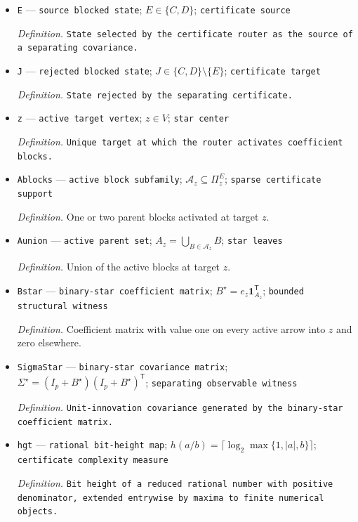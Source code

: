\documentclass{article}
\begin{document}
\begin{itemize}
  \item \texttt{E} --- \texttt{source blocked state}; \(E\in\{C,D\}\); \texttt{certificate source}
  \par\smallskip\noindent\emph{Definition.} \texttt{State selected by the certificate router as the source of a separating covariance.}
  \item \texttt{J} --- \texttt{rejected blocked state}; \(J\in\{C,D\}\setminus\{E\}\); \texttt{certificate target}
  \par\smallskip\noindent\emph{Definition.} \texttt{State rejected by the separating certificate.}
  \item \texttt{z} --- \texttt{active target vertex}; \(z\in V\); \texttt{star center}
  \par\smallskip\noindent\emph{Definition.} \texttt{Unique target at which the router activates coefficient blocks.}
  \item \texttt{Ablocks} --- \texttt{active block subfamily}; \(\mathcal A_z\subseteq\Pi^E_z\); \texttt{sparse certificate support}
  \par\smallskip\noindent\emph{Definition.} One or two parent blocks activated at target \(z\).
  \item \texttt{Aunion} --- \texttt{active parent set}; \(A_z=\bigcup_{B\in\mathcal A_z}B\); \texttt{star leaves}
  \par\smallskip\noindent\emph{Definition.} Union of the active blocks at target \(z\).
  \item \texttt{Bstar} --- \texttt{binary-\allowbreak{}star coefficient matrix}; \(B^{\star}=e_z\mathbf 1_{A_z}^{\mathsf T}\); \texttt{bounded structural witness}
  \par\smallskip\noindent\emph{Definition.} Coefficient matrix with value one on every active arrow into \(z\) and zero elsewhere.
  \item \texttt{SigmaStar} --- \texttt{binary-\allowbreak{}star covariance matrix}; \(\Sigma^{\star}=(I_p+B^{\star})(I_p+B^{\star})^{\mathsf T}\); \texttt{separating observable witness}
  \par\smallskip\noindent\emph{Definition.} \texttt{Unit-\allowbreak{}innovation covariance generated by the binary-\allowbreak{}star coefficient matrix.}
  \item \texttt{hgt} --- \texttt{rational bit-\allowbreak{}height map}; \(h(a/b)=\lceil\log_2\max\{1,|a|,b\}\rceil\); \texttt{certificate complexity measure}
  \par\smallskip\noindent\emph{Definition.} \texttt{Bit height of a reduced rational number with positive denominator,\allowbreak{} extended entrywise by maxima to finite numerical objects.}

\end{itemize}
\end{document}
